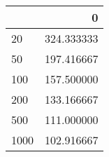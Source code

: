 \begin{tabular}{lr}
\toprule
{} &           0 \\
\midrule
20   &  324.333333 \\
50   &  197.416667 \\
100  &  157.500000 \\
200  &  133.166667 \\
500  &  111.000000 \\
1000 &  102.916667 \\
\bottomrule
\end{tabular}
